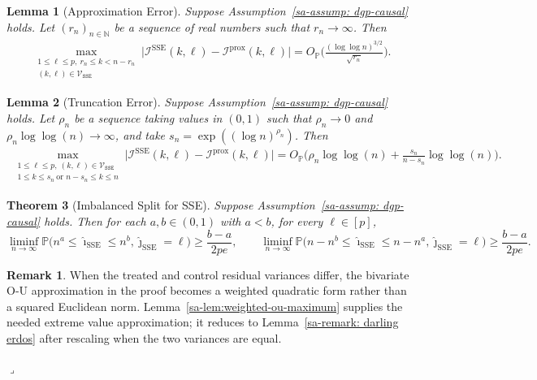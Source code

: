 \documentclass[10pt]{article}
\def\P{\mathbb{P}}
\def\I{\mathscr{I}}
\newtheorem{theorem}{Theorem}%
\newtheorem{lemma}[theorem]{Lemma}
\theoremstyle{definition}
\newtheorem{remark_tmp}{Remark}
\newenvironment{remark}
	{ \begin{remark_tmp} 	}
	{ 
		\medskip\hfill{\LARGE$\lrcorner$}
		\end{remark_tmp} 
	}
\theoremstyle{remark}
\begin{document}
\begin{lemma}[Approximation Error]\label{lem: approximation fit based -- balanced region}
Suppose Assumption~\ref{sa-assump: dgp-causal} holds. Let $(r_n)_{n \in \mathbb{N}}$ be a sequence of real numbers such that $r_n \rightarrow \infty$. Then
\begin{align*}  
    \max_{\substack{1 \leq \ell \leq p,\ r_n \leq k < n - r_n\\ (k,\ell)\in\mathcal{V}_{\mathtt{SSE}}}} \Big|\I^{\text{SSE}}(k,\ell) - \I^{\text{prox}}(k,\ell)\Big| = O_{\P} \bigg(\frac{(\log \log n)^{3/2}}{\sqrt{r_n}}\bigg).
\end{align*}
\end{lemma}

\begin{lemma}[Truncation Error]\label{lem: approximation fit based -- imbalanced region}
Suppose Assumption~\ref{sa-assump: dgp-causal} holds. Let $\rho_n$ be a sequence taking values in $(0,1)$ such that $\rho_n \to 0$ and $\rho_n \log \log(n) \to \infty$, and take $s_n = \exp((\log n)^{\rho_n})$. Then
\begin{align*}  
    \max_{\substack{1 \leq \ell \leq p,\ (k,\ell)\in\mathcal{V}_{\mathtt{SSE}}\\ 1 \leq k \leq s_n\ \text{or } n - s_n \leq k \leq n}} \Big|\I^{\text{SSE}}(k,\ell) - \I^{\text{prox}}(k,\ell)\Big| = O_\P\bigg(\rho_n \log \log (n) + \frac{s_n}{n - s_n} \log \log(n)\bigg).
\end{align*}
\end{lemma}

\begin{theorem}[Imbalanced Split for SSE]\label{thm: inconsistency fit}
Suppose Assumption~\ref{sa-assump: dgp-causal} holds. Then for each $a,b \in (0,1)$ with $a < b$, for every $\ell \in [p]$,
    \begin{equation*}
    \liminf_{n\to\infty} \mathbb{P}\big( n^{a} \leq \hat{\imath}_\text{SSE} \leq n^{b}, \hat{\jmath}_\text{SSE} = \ell \big) \geq \frac{b-a}{2pe},
    \qquad
    \liminf_{n\to\infty} \mathbb{P}\big( n-n^{b} \leq \hat{\imath}_\text{SSE} \leq n-n^{a}, \hat{\jmath}_\text{SSE} = \ell \big) \geq \frac{b-a}{2pe}.
    \end{equation*}
\end{theorem}

\begin{remark}
When the treated and control residual variances differ, the bivariate O-U approximation in the proof becomes a weighted quadratic form rather than a squared Euclidean norm. Lemma~\ref{sa-lem:weighted-ou-maximum} supplies the needed extreme value approximation; it reduces to Lemma~\ref{sa-remark: darling erdos} after rescaling when the two variances are equal.
\end{remark}
\end{document}
